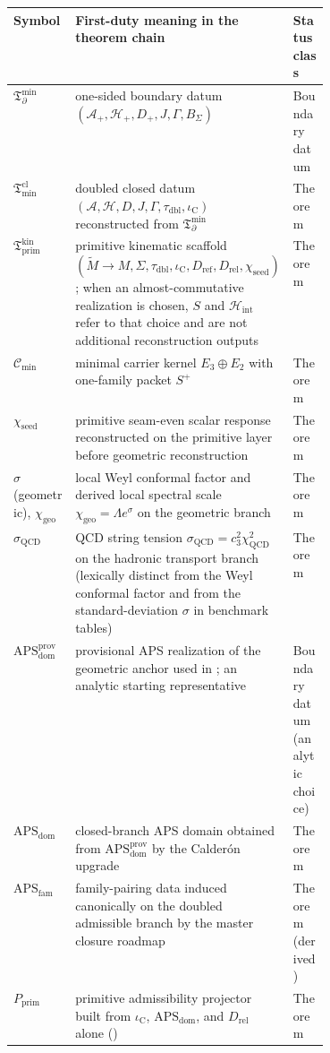 \documentclass[11pt,a4paper]{article}
\theoremstyle{definition}
\theoremstyle{remark}
\newcommand{\Seam}{\Sigma}
\newcommand{\taudbl}{\tau_{\mathrm{dbl}}}
\newcommand{\iC}{\iota_{\mathrm C}}
\newcommand{\cthree}{c_3}
\newcommand{\QCD}{\mathrm{QCD}}
\newcommand{\Cmin}{\mathcal C_{\min}}
\newcommand{\Hint}{\mathcal H_{\mathrm{int}}}
\newcommand{\Tmin}{\mathfrak T_{\mathrm{min}}}
\newcommand{\Tbound}{\mathfrak T_{\partial}^{\min}}
\newcommand{\Tprim}{\mathfrak T_{\mathrm{prim}}}
\newcommand{\chiseed}{\chi_{\mathrm{seed}}}
\newcommand{\chigeo}{\chi_{\mathrm{geo}}}
\newcommand{\APSdom}{\mathrm{APS}_{\mathrm{dom}}}
\newcommand{\APSfam}{\mathrm{APS}_{\mathrm{fam}}}
\newcommand{\Pprim}{P_{\mathrm{prim}}}
\newcommand{\APSdomprov}{\mathrm{APS}_{\mathrm{dom}}^{\mathrm{prov}}}
\newcommand{\sigmaQCD}{\sigma_{\mathrm{QCD}}}
\begin{document}
\begin{table}[p]
\centering
\scriptsize
\setlength{\tabcolsep}{3pt}
\renewcommand{\arraystretch}{0.95}
\begin{tabularx}{\linewidth}{@{}>{\raggedright\arraybackslash}p{0.23\linewidth}Y>{\raggedright\arraybackslash}p{0.18\linewidth}@{}}
\toprule
Symbol & First-duty meaning in the theorem chain & Status class \\
\midrule
$\Tbound$ & one-sided boundary datum $(\mathcal A_+,\mathcal H_+,D_+,J,\Gamma,B_\Sigma)$ & Boundary datum \\
$\Tmin^{\mathrm{cl}}$ & doubled closed datum $(\mathcal A,\mathcal H,D,J,\Gamma,\taudbl,\iC)$ reconstructed from $\Tbound$ & Theorem \\
$\Tprim^{\mathrm{kin}}$ & primitive kinematic scaffold $(\widetilde M\to M,\Seam,\taudbl,\iC,D_{\mathrm{ref}},D_{\mathrm{rel}},\chiseed)$; when an almost-commutative realization is chosen, $S$ and $\Hint$ refer to that choice and are not additional reconstruction outputs & Theorem \\
$\Cmin$ & minimal carrier kernel $E_3\oplus E_2$ with one-family packet $S^+$ & Theorem \\
$\chiseed$ & primitive seam-even scalar response reconstructed on the primitive layer before geometric reconstruction & Theorem \\
$\sigma$ (geometric), $\chigeo$ & local Weyl conformal factor and derived local spectral scale $\chigeo=\Lambda e^\sigma$ on the geometric branch & Theorem \\
$\sigmaQCD$ & QCD string tension $\sigmaQCD=\cthree^2\chi_{\QCD}^2$ on the hadronic transport branch (lexically distinct from the Weyl conformal factor and from the standard-deviation $\sigma$ in benchmark tables) & Theorem \\
$\APSdomprov$ & provisional APS realization of the geometric anchor used in ; an analytic starting representative & Boundary datum (analytic choice) \\
$\APSdom$ & closed-branch APS domain obtained from $\APSdomprov$ by the Calder\'on upgrade  & Theorem \\
$\APSfam$ & family-pairing data induced canonically on the doubled admissible branch by the master closure roadmap & Theorem (derived) \\
$\Pprim$ & primitive admissibility projector built from $\iC$, $\APSdom$, and $D_{\mathrm{rel}}$ alone () & Theorem \\

\end{tabularx}
\end{table}
\end{document}
